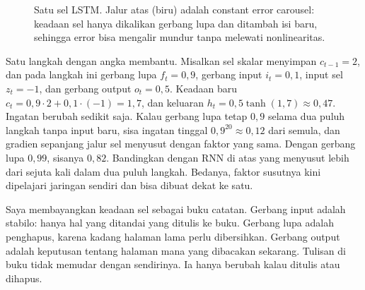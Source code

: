 \begin{figure}[ht]
\centering
{}
\caption{Satu sel LSTM. Jalur atas (biru) adalah constant error carousel: keadaan sel hanya dikalikan gerbang lupa dan
ditambah isi baru, sehingga error bisa mengalir mundur tanpa melewati nonlinearitas.}
\label{fig:lstm}
\end{figure}

Satu langkah dengan angka membantu. Misalkan sel skalar menyimpan $c_{t-1}=2$, dan pada langkah ini gerbang lupa
$f_t=0{,}9$, gerbang input $i_t=0{,}1$, input sel $z_t=-1$, dan gerbang output $o_t=0{,}5$. Keadaan baru
$c_t=0{,}9\cdot2+0{,}1\cdot(-1)=1{,}7$, dan keluaran $h_t=0{,}5\tanh(1{,}7)\approx0{,}47$. Ingatan berubah sedikit saja.
Kalau gerbang lupa tetap $0{,}9$ selama dua puluh langkah tanpa input baru, sisa ingatan tinggal $0{,}9^{20}\approx0{,}12$
dari semula, dan gradien sepanjang jalur sel menyusut dengan faktor yang sama. Dengan gerbang lupa $0{,}99$, sisanya
$0{,}82$. Bandingkan dengan RNN di atas yang menyusut lebih dari sejuta kali dalam dua puluh langkah. Bedanya, faktor
susutnya kini dipelajari jaringan sendiri dan bisa dibuat dekat ke satu.

Saya membayangkan keadaan sel sebagai buku catatan. Gerbang input adalah stabilo: hanya hal yang
ditandai yang ditulis ke buku. Gerbang lupa adalah penghapus, karena kadang halaman lama perlu
dibersihkan. Gerbang output adalah keputusan tentang halaman mana yang dibacakan sekarang.
Tulisan di buku tidak memudar dengan sendirinya. Ia hanya berubah kalau ditulis atau dihapus.

